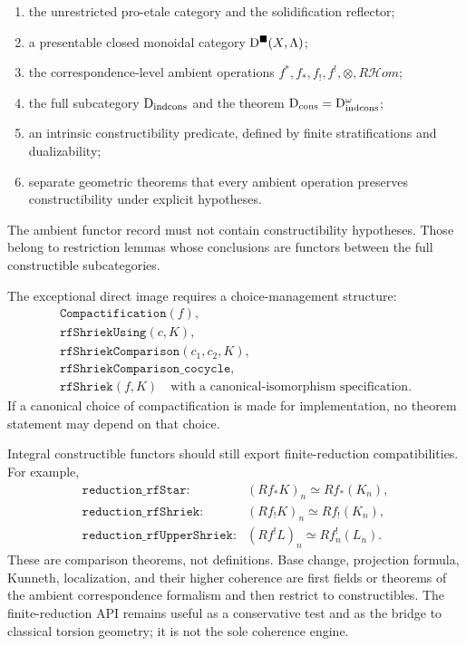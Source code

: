 \begin{enumerate}
\item the unrestricted pro-etale category and the solidification reflector;
\item a presentable closed monoidal category \(\mathrm D^{\blacksquare}(X,\Lambda)\);
\item the correspondence-level ambient operations
      \(f^*,f_*,f_!,f^!,\otimes,R\mathcal Hom\);
\item the full subcategory \(\mathrm D_{\mathrm{indcons}}\) and the theorem
      \(\mathrm D_{\mathrm{cons}}=\mathrm D_{\mathrm{indcons}}^\omega\);
\item an intrinsic constructibility predicate, defined by finite
      stratifications and dualizability;
\item separate geometric theorems that every ambient operation preserves
      constructibility under explicit hypotheses.
\end{enumerate}

The ambient functor record must not contain constructibility hypotheses.
Those belong to restriction lemmas whose conclusions are functors between
the full constructible subcategories.

The exceptional direct image requires a choice-management structure:
\[
\begin{array}{l}
\texttt{Compactification}(f),\\
\texttt{rfShriekUsing}(c,K),\\
\texttt{rfShriekComparison}(c_1,c_2,K),\\
\texttt{rfShriekComparison\_cocycle},\\
\texttt{rfShriek}(f,K)
\quad\text{with a canonical-isomorphism specification}.
\end{array}
\tag{C.5}\label{eq:formalization-rfshriek}
\]
If a canonical choice of compactification is made for implementation, no
theorem statement may depend on that choice.

Integral constructible functors should still export finite-reduction
compatibilities.  For example,
\[
\begin{aligned}
\texttt{reduction\_rfStar}:&
 (Rf_*K)_n\simeq Rf_*(K_n),\\
\texttt{reduction\_rfShriek}:&
 (Rf_!K)_n\simeq Rf_!(K_n),\\
\texttt{reduction\_rfUpperShriek}:&
 (Rf^!L)_n\simeq Rf_n^!(L_n).
\end{aligned}
\tag{C.6}\label{eq:formalization-six-reduction}
\]
These are comparison theorems, not definitions.  Base change, projection
formula, Kunneth, localization, and their higher coherence are first fields
or theorems of the ambient correspondence formalism and then restrict to
constructibles.  The finite-reduction API remains useful as a conservative
test and as the bridge to classical torsion geometry; it is not the sole
coherence engine.

